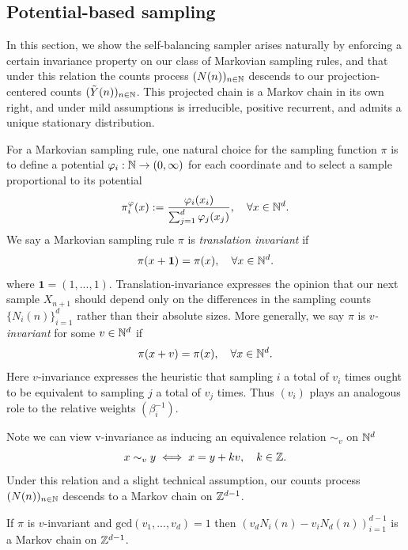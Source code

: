 \subsection{Potential-based sampling}
\label{sec:potential_biased_sampling}

In this section, we show the self-balancing sampler arises naturally by enforcing a certain invariance property on our class of Markovian sampling rules, and that under
this relation the counts process $(N(n))_{n \in \mathbb{N}}$ descends
to our projection-centered counts $(\tilde{Y}(n))_{n \in \mathbb{N}}$. This projected chain is a Markov chain in its own right, and under mild assumptions is irreducible, positive recurrent, and admits a unique stationary distribution.

 For a Markovian sampling rule, one natural choice for the sampling function $\pi$ is to define a potential $\varphi_i: \mathbb{N} \to (0, \infty)$ for each coordinate and to select a sample proportional to its potential
%
\[\pi^\varphi_i(x) := \frac{\varphi_i(x_i)}{\sum_{j=1}^d \varphi_j(x_j)}, \quad \forall x \in \mathbb{N}^d.\]
%
\noindent We say a Markovian sampling rule $\pi$ is \textit{translation invariant} if
%
\[\pi(x + \mathbf{1}) = \pi(x), \quad \forall x \in \mathbb{N}^d.\]
%
\noindent where $\mathbf{1} = (1,...,1)$. Translation-invariance expresses the opinion that 
our next sample $X_{n+1}$ should depend only on the differences in the sampling 
counts $\{N_i(n)\}_{i=1}^d$ rather than their absolute sizes. 
More generally, we say $\pi$ is \emph{$v$-invariant} for some $v \in \mathbb{N}^d$ if
%
\[\pi(x + v) = \pi(x), \quad \forall x \in \mathbb{N}^d.\]
%
\noindent Here $v$-invariance expresses the heuristic that sampling $i$ a total of $v_i$ times 
ought to be equivalent to sampling $j$ a total of $v_j$ times. Thus $(v_i)$ plays an analogous role 
to the relative weights $(\beta_i^{-1})$. 

Note we can view v-invariance as inducing an equivalence relation $\sim_v$ on $\mathbb{N}^d$
%
    \[x \sim_v y \iff x = y + k v, \quad k \in \mathbb{Z}.\]
%
\noindent Under this relation and a slight technical assumption, our counts process $(N(n))_{n \in \mathbb{N}}$
 descends to a Markov chain on $\mathbb{Z}^{d-1}$.

\begin{proposition}
\label{prop:projection_centered_counts_are_markovian}
    If $\pi$ is $v$-invariant and $\mathrm{gcd}(v_1,..., v_d) = 1$
    then $(v_dN_i(n) - v_i N_d(n))_{i=1}^{d-1}$ is a Markov chain on $\mathbb{Z}^{d-1}$.
\end{proposition}

